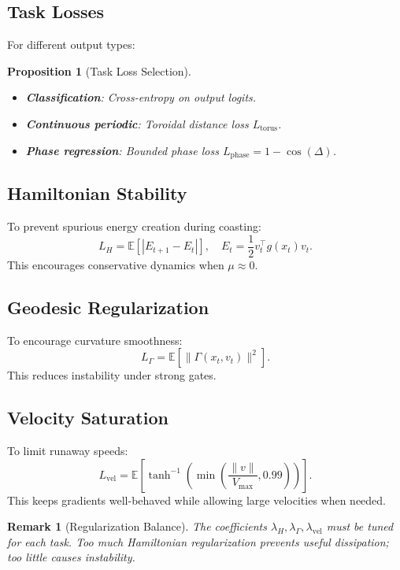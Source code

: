 \documentclass[12pt,letterpaper,twoside]{article}
\newtheorem{remarque}{Remark}[section]
\newtheorem{prop}{Proposition}[section]
\begin{document}
\subsection{Task Losses}

For different output types:

\begin{prop}[Task Loss Selection]
\begin{itemize}
\item \textbf{Classification}: Cross-entropy on output logits.
\item \textbf{Continuous periodic}: Toroidal distance loss $L_{\text{torus}}$.
\item \textbf{Phase regression}: Bounded phase loss $L_{\text{phase}} = 1 - \cos(\Delta)$.
\end{itemize}
\end{prop}

\subsection{Hamiltonian Stability}

To prevent spurious energy creation during coasting:
\[
L_H = \mathbb{E}\left[|E_{t+1} - E_t|\right], \quad E_t = \frac{1}{2}v_t^\top g(x_t) v_t.
\]
This encourages conservative dynamics when $\mu \approx 0$.

\subsection{Geodesic Regularization}

To encourage curvature smoothness:
\[
L_\Gamma = \mathbb{E}\left[\|\Gamma(x_t, v_t)\|^2\right].
\]
This reduces instability under strong gates.

\subsection{Velocity Saturation}

To limit runaway speeds:
\[
L_{\text{vel}} = \mathbb{E}\left[\tanh^{-1}\left(\min\left(\frac{\|v\|}{V_{\max}}, 0.99\right)\right)\right].
\]
This keeps gradients well-behaved while allowing large velocities when needed.

\begin{remarque}[Regularization Balance]
The coefficients $\lambda_H, \lambda_\Gamma, \lambda_{\text{vel}}$ must be tuned for each task. Too much Hamiltonian regularization prevents useful dissipation; too little causes instability.
\end{remarque}
\end{document}
